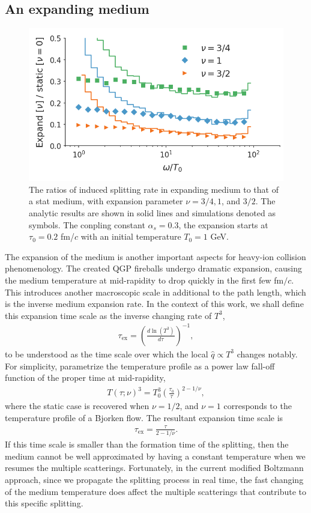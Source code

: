 \documentclass[aps, prc, reprint, amsmath, groupedaddress, nofootinbib]{revtex4-1}
\begin{document}
\subsection{An expanding medium}
\begin{figure}
\includegraphics[width=\columnwidth]{spectrum_Bjorken.png}
\caption{The ratios of induced splitting rate in expanding medium to that of a stat medium, with expansion parameter $\nu = 3/4, 1$, and $3/2$. The analytic results are shown in solid lines and simulations denoted as symbols. The conpling constant $\alpha_s=0.3$, the expansion starts at $\tau_0 = 0.2$ fm/$c$ with an initial temperature $T_0 = 1$ GeV.}
\label{fig:Bjorken-BDMPS}
\end{figure}

The expansion of the medium is another important aspects for heavy-ion collision phenomenology.
The created QGP fireballs undergo dramatic expansion, causing the medium temperature at mid-rapidity to drop quickly in the first few fm$/c$.
This introduces another macroscopic scale in additional to the path length, which is the inverse medium expansion rate. 
In the context of this work, we shall define this expansion time scale as the inverse changing rate of $T^3$,
\begin{eqnarray}
\tau_{\textrm{ex}} = \left(\frac{d\ln(T^3)}{d \tau} \right)^{-1},
\end{eqnarray}
to be understood as the time scale over which the local $\hat{q}\propto T^3$ changes notably.
For simplicity, parametrize the temperature profile as a power law fall-off function of the proper time at mid-rapidity,
\begin{eqnarray}
T(\tau; \nu)^3 = T_0^3\left(\frac{\tau_0}{\tau}\right)^{2-1/\nu},
\end{eqnarray}
where the static case is recovered when $\nu=1/2$, and $\nu=1$ corresponds to the temperature profile of a Bjorken flow.
The resultant expansion time scale is
\begin{eqnarray}
\tau_{\textrm{ex}} = \frac{\tau}{2-1/\nu}.
\end{eqnarray}
If this time scale is smaller than the formation time of the splitting, then the medium cannot be well approximated by having a constant temperature when we resumes the multiple scatterings.
Fortunately, in the current modified Boltzmann approach, since we propagate the splitting process in real time, the fast changing of the medium temperature does affect the multiple scatterings that contribute to this specific splitting.
\end{document}
